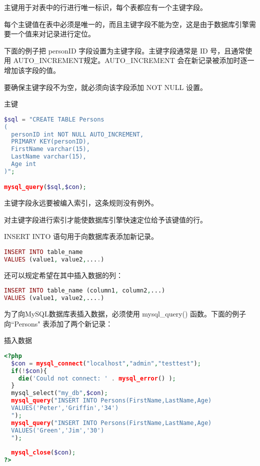 
主键用于对表中的行进行唯一标识，每个表都应有一个主键字段。


每个主键值在表中必须是唯一的，而且主键字段不能为空，这是由于数据库引擎需要一个值来对记录进行定位。

下面的例子把 personID 字段设置为主键字段。主键字段通常是 ID 号，且通常使用 AUTO\_INCREMENT规定。AUTO\_INCREMENT 会在新记录被添加时逐一增加该字段的值。

要确保主键字段不为空，就必须向该字段添加 NOT NULL 设置。

\begin{example}
主键
\begin{lstlisting}[language=PHP]
$sql = "CREATE TABLE Persons
(
  personID int NOT NULL AUTO_INCREMENT,
  PRIMARY KEY(personID),
  FirstName varchar(15),
  LastName varchar(15),
  Age int
)";

mysql_query($sql,$con);
\end{lstlisting}
\end{example}


主键字段永远要被编入索引，这条规则没有例外。

对主键字段进行索引才能使数据库引擎快速定位给予该键值的行。

INSERT INTO 语句用于向数据库表添加新记录。


\begin{lstlisting}[language=PHP]
INSERT INTO table_name
VALUES (value1, value2,....)
\end{lstlisting}

还可以规定希望在其中插入数据的列：

\begin{lstlisting}[language=PHP]
INSERT INTO table_name (column1, column2,...)
VALUES (value1, value2,....)
\end{lstlisting}

为了向MySQL数据库表插入数据，必须使用 mysql\_query() 函数。下面的例子向``Persons" 表添加了两个新记录：

\begin{example}
插入数据
\begin{lstlisting}[language=PHP]
<?php
  $con = mysql_connect("localhost","admin","testtest");
  if(!$con){
    die('Could not connect: ' . mysql_error() );
  }
  mysql_select("my_db",$con);
  mysql_query("INSERT INTO Persons(FirstName,LastName,Age)
  VALUES('Peter','Griffin','34')
  ");
  mysql_query("INSERT INTO Persons(FirstName,LastName,Age)
  VALUES('Green','Jim','30')
  ");
  
  mysql_close($con);
?>
\end{lstlisting}
\end{example}


